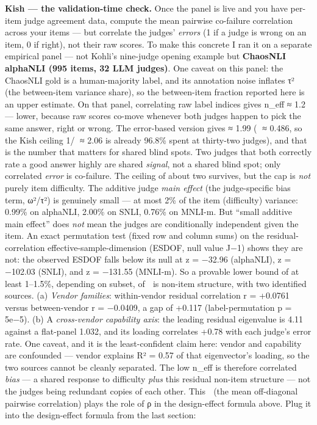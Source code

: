 \documentclass[11pt]{article}
\begin{document}
\textbf{Kish — the validation-time check.} Once the panel is live and you have per-item judge agreement data, compute the mean pairwise co-failure correlation  across your items — but correlate the judges' \emph{errors} (1 if a judge is wrong on an item, 0 if right), not their raw scores. To make this concrete I ran it on a separate empirical panel — not Kohli's nine-judge opening example but \textbf{ChaosNLI alphaNLI (995 items, 32 LLM judges)}. One caveat on this panel: the ChaosNLI gold is a human-majority label, and its annotation noise inflates τ² (the between-item variance share), so the between-item fraction reported here is an upper estimate. On that panel, correlating raw label indices gives n\_eff ≈ 1.2 — lower, because raw scores co-move whenever both judges happen to pick the same answer, right or wrong. The error-based version gives ≈ 1.99 ( ≈ 0.486, so the Kish ceiling 1/ ≈ 2.06 is already 96.8\% spent at thirty-two judges), and that is the number that matters for shared blind spots. Two judges that both correctly rate a good answer highly are shared \emph{signal}, not a shared blind spot; only correlated \emph{error} is co-failure. The ceiling of about two survives, but the cap is \emph{not} purely item difficulty. The additive judge \emph{main effect} (the judge-specific bias term, ω²/τ²) is genuinely small — at most 2\% of the item (difficulty) variance: 0.99\% on alphaNLI, 2.00\% on SNLI, 0.76\% on MNLI-m. But ``small additive main effect'' does \emph{not} mean the judges are conditionally independent given the item. An exact permutation test (fixed row and column sums) on the residual-correlation effective-sample-dimension (ESDOF, null value J−1) shows they are not: the observed ESDOF falls below its null at z = −32.96 (alphaNLI), z = −102.03 (SNLI), and z = −131.55 (MNLI-m). So a provable lower bound of at least 1--1.5\%, depending on subset, of  is non-item structure, with two identified sources. (a) \emph{Vendor families}: within-vendor residual correlation r = +0.0761 versus between-vendor r = −0.0409, a gap of +0.117 (label-permutation p = 5e−5). (b) A \emph{cross-vendor capability axis}: the leading residual eigenvalue is 4.11 against a flat-panel 1.032, and its loading correlates +0.78 with each judge's error rate. One caveat, and it is the least-confident claim here: vendor and capability are confounded — vendor explains R² = 0.57 of that eigenvector's loading, so the two sources cannot be cleanly separated. The low n\_eff is therefore correlated \emph{bias} — a shared response to difficulty \emph{plus} this residual non-item structure — not the judges being redundant copies of each other. This  (the mean off-diagonal pairwise correlation) plays the role of ρ in the design-effect formula above. Plug it into the design-effect formula from the last section:
\end{document}
